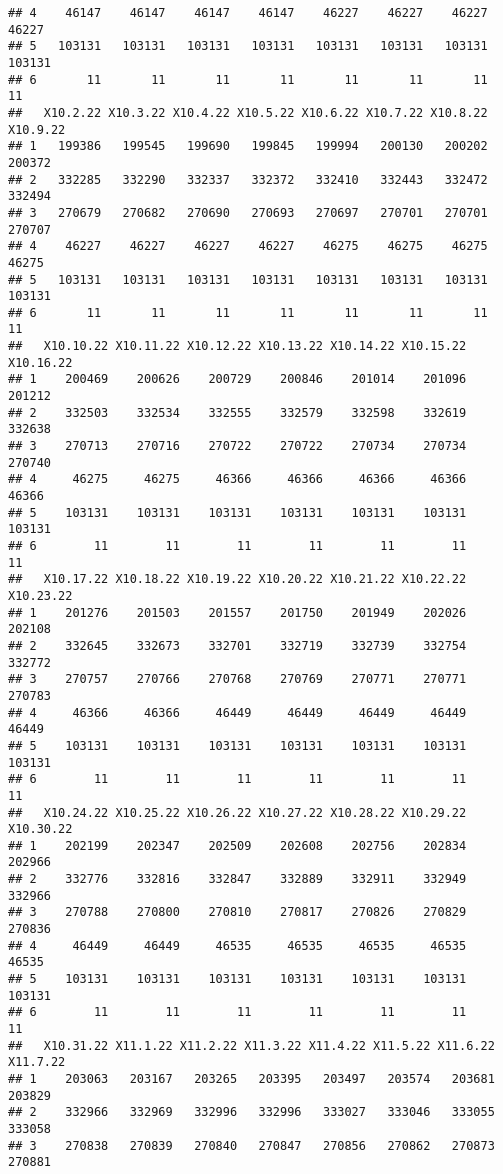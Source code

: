 \documentclass[
]{article}
\begin{document}
\begin{verbatim}
## 4    46147    46147    46147    46147    46227    46227    46227    46227
## 5   103131   103131   103131   103131   103131   103131   103131   103131
## 6       11       11       11       11       11       11       11       11
##   X10.2.22 X10.3.22 X10.4.22 X10.5.22 X10.6.22 X10.7.22 X10.8.22 X10.9.22
## 1   199386   199545   199690   199845   199994   200130   200202   200372
## 2   332285   332290   332337   332372   332410   332443   332472   332494
## 3   270679   270682   270690   270693   270697   270701   270701   270707
## 4    46227    46227    46227    46227    46275    46275    46275    46275
## 5   103131   103131   103131   103131   103131   103131   103131   103131
## 6       11       11       11       11       11       11       11       11
##   X10.10.22 X10.11.22 X10.12.22 X10.13.22 X10.14.22 X10.15.22 X10.16.22
## 1    200469    200626    200729    200846    201014    201096    201212
## 2    332503    332534    332555    332579    332598    332619    332638
## 3    270713    270716    270722    270722    270734    270734    270740
## 4     46275     46275     46366     46366     46366     46366     46366
## 5    103131    103131    103131    103131    103131    103131    103131
## 6        11        11        11        11        11        11        11
##   X10.17.22 X10.18.22 X10.19.22 X10.20.22 X10.21.22 X10.22.22 X10.23.22
## 1    201276    201503    201557    201750    201949    202026    202108
## 2    332645    332673    332701    332719    332739    332754    332772
## 3    270757    270766    270768    270769    270771    270771    270783
## 4     46366     46366     46449     46449     46449     46449     46449
## 5    103131    103131    103131    103131    103131    103131    103131
## 6        11        11        11        11        11        11        11
##   X10.24.22 X10.25.22 X10.26.22 X10.27.22 X10.28.22 X10.29.22 X10.30.22
## 1    202199    202347    202509    202608    202756    202834    202966
## 2    332776    332816    332847    332889    332911    332949    332966
## 3    270788    270800    270810    270817    270826    270829    270836
## 4     46449     46449     46535     46535     46535     46535     46535
## 5    103131    103131    103131    103131    103131    103131    103131
## 6        11        11        11        11        11        11        11
##   X10.31.22 X11.1.22 X11.2.22 X11.3.22 X11.4.22 X11.5.22 X11.6.22 X11.7.22
## 1    203063   203167   203265   203395   203497   203574   203681   203829
## 2    332966   332969   332996   332996   333027   333046   333055   333058
## 3    270838   270839   270840   270847   270856   270862   270873   270881

\end{verbatim}
\end{document}
